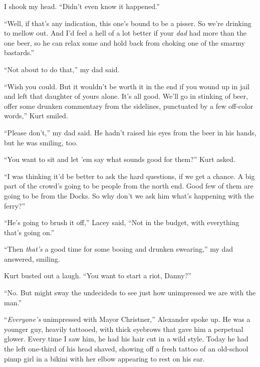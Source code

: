 I shook my head.  ``Didn't even know it happened.''



``Well, if that's any indication, this one's bound to be a pisser.  So we're drinking to mellow out.  And I'd feel a hell of a lot better if your \emph{dad} had more than the one beer, so he can relax some and hold back from choking one of the smarmy bastards.''



``Not about to do that,'' my dad said.



``Wish you could.  But it wouldn't be worth it in the end if you wound up in jail and left that daughter of yours alone.  It's all good.  We'll go in stinking of beer, offer some drunken commentary from the sidelines, punctuated by a few off-color words,'' Kurt smiled.



``Please don't,'' my dad said.  He hadn't raised his eyes from the beer in his hands, but he was smiling, too.



``You want to sit and let 'em say what sounds good for them?''  Kurt asked.



``I was thinking it'd be better to ask the hard questions, if we get a chance.  A big part of the crowd's going to be people from the north end.  Good few of them are going to be from the Docks.  So why don't we ask him what's happening with the ferry?''



``He's going to brush it off,'' Lacey said, ``Not in the budget, with everything that's going on.''



``Then \emph{that's} a good time for some booing and drunken swearing,'' my dad answered, smiling.



Kurt busted out a laugh.  ``You want to start a riot, Danny?''



``No.  But might sway the undecideds to see just how unimpressed we are with the man.''



``\emph{Everyone's} unimpressed with Mayor Christner,'' Alexander spoke up.  He was a younger guy, heavily tattooed, with thick eyebrows that gave him a perpetual glower.  Every time I saw him, he had his hair cut in a wild style.  Today he had the left one-third of his head shaved, showing off a fresh tattoo of an old-school pinup girl in a bikini with her elbow appearing to rest on his ear.



